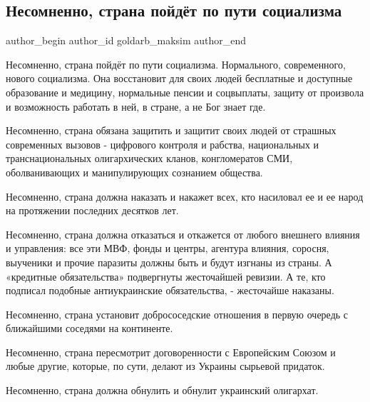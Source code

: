  
 
 
 
 
 
\subsection{Несомненно, страна пойдёт по пути социализма}
\label{sec:13_01_2022.fb.goldarb_maksim.1.socializm}
 
\ifcmt
 author_begin
   author_id goldarb_maksim
 author_end
\fi

Несомненно, страна пойдёт по пути социализма. Нормального, современного, нового
социализма. Она восстановит для своих людей бесплатные и доступные образование
и медицину, нормальные пенсии и соцвыплаты, защиту от произвола и возможность
работать в ней, в стране, а не Бог знает где. 

Несомненно, страна обязана защитить и защитит своих людей от страшных
современных вызовов - цифрового контроля и рабства, национальных и
транснациональных олигархических кланов, конгломератов СМИ, оболванивающих и
манипулирующих сознанием общества. 

Несомненно, страна должна наказать и накажет всех, кто насиловал ее и ее народ
на протяжении последних десятков лет. 

Несомненно, страна должна отказаться и откажется от любого внешнего влияния и
управления: все эти МВФ, фонды и центры, агентура влияния, соросня, выученики и
прочие паразиты должны быть и будут изгнаны из страны. А «кредитные
обязательства» подвергнуты жесточайшей ревизии. А те, кто подписал подобные
антиукраинские обязательства, - жесточайше наказаны. 

Несомненно, страна установит добрососедские отношения в первую очередь с
ближайшими соседями на континенте.

Несомненно, страна пересмотрит  договоренности с Европейским Союзом и любые
другие, которые, по сути, делают из Украины сырьевой придаток.

Несомненно, страна должна обнулить и обнулит украинский олигархат.


